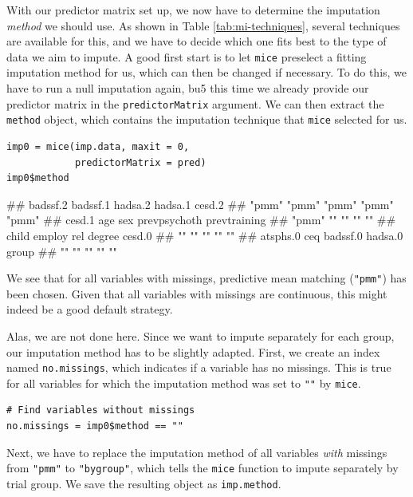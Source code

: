 With our predictor matrix set up, we now have to determine the imputation \emph{method} we should use. As shown in Table \ref{tab:mi-techniques}, several techniques are available for this, and we have to decide which one fits best to the type of data we aim to impute. A good first start is to let \texttt{mice} preselect a fitting imputation method for us, which can then be changed if necessary. To do this, we have to run a null imputation again, bu5 this time we already provide our predictor matrix in the \texttt{predictorMatrix} argument. We can then extract the \texttt{method} object, which contains the imputation technique that \texttt{mice} selected for us.

\begin{lstlisting}
imp0 = mice(imp.data, maxit = 0,
            predictorMatrix = pred)
imp0$method
\end{lstlisting}

\begin{example}
## badssf.2     badssf.1      hadsa.2      hadsa.1       cesd.2 
##    "pmm"        "pmm"        "pmm"        "pmm"        "pmm" 
##   cesd.1          age          sex prevpsychoth prevtraining 
##    "pmm"           ""           ""           ""           "" 
##    child       employ          rel       degree       cesd.0 
##       ""           ""           ""           ""           "" 
## atsphs.0          ceq     badssf.0      hadsa.0        group 
##       ""           ""           ""           ""           "" 
\end{example}

We see that for all variables with missings, predictive mean matching (\texttt{"pmm"}) has been chosen. Given that all variables with missings are continuous, this might indeed be a good default strategy. 

Alas, we are not done here. Since we want to impute separately for each group, our imputation method has to be slightly adapted. First, we create an index named \texttt{no.missings}, which indicates if a variable has no missings. This is true for all variables for which the imputation method was set to \texttt{""} by \texttt{mice}.

\begin{lstlisting}
# Find variables without missings
no.missings = imp0$method == ""
\end{lstlisting}

Next, we have to replace the imputation method of all variables \emph{with} missings from \texttt{"pmm"} to \texttt{"bygroup"}, which tells the \texttt{mice} function to impute separately by trial group. We save the resulting object as \texttt{imp.method}.

